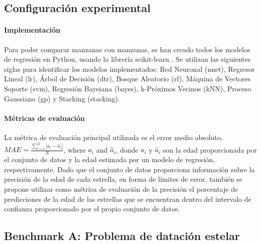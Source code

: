 \subsection{Configuración experimental}

\paragraph{Implementación} 
Para poder comparar manzanas con manzanas, se han creado todos los modelos de regresión en Python, usando la librería scikit-learn \cite{scikit-learn}. Se utilizan las siguientes siglas para identificar los modelos implementados: Red Neuronal (nnet), Regresor Lineal (lr), Árbol de Decisión (dtr), Bosque Aleatorio (rf), Máquina de Vectores Soporte (svm), Regresión Bayeiana (bayes), k-Próximos Vecinos (kNN), Proceso Gaussiano (gp) y Stacking (stacking).

\paragraph{Métricas de evaluación}
La métrica de evaluación principal utilizada es el error medio absoluto, $MAE = \frac{\sum_{i=1}^{N}|a_i-\hat{a}_i|}{N}$, where $a_i$ and $\hat{a}_i$, donde $a_i$ y $\hat{a}_i$ son la edad proporcionada por el conjunto de datos y la edad estimada por un modelo de regresión, respectivamente. Dado que el conjunto de datos proporciona información sobre la precisión de la edad de cada estrella, en forma de límites de error, también se propone utilizar como métrica de evaluación de la precisión el porcentaje de predicciones de la edad de las estrellas que se encuentran dentro del intervalo de confianza proporcionado por el propio conjunto de datos.

\subsection{Benchmark A: Problema de datación estelar}

